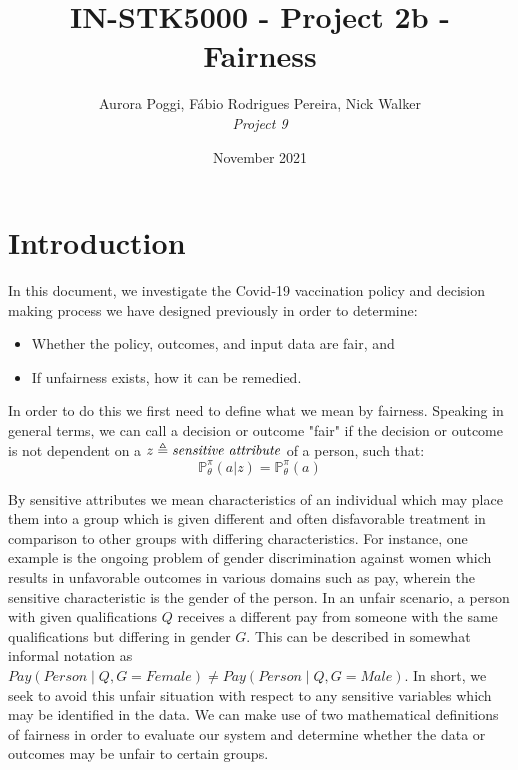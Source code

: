 \documentclass{article}
\title{IN-STK5000 - Project 2b - Fairness}
\author{Aurora Poggi, Fábio Rodrigues Pereira, Nick Walker \\
\emph{Project 9}}
\date{November 2021}
\begin{document}
\maketitle

\tableofcontents

\clearpage

\section{Introduction}
\label{sec: Introduction}

In this document, we investigate the Covid-19 vaccination policy and decision making process we have designed previously in order to determine: 
\begin{itemize}
    \item Whether the policy, outcomes, and input data are fair, and 
    \item If unfairness exists, how it can be remedied. 
\end{itemize}

In order to do this we first need to define what we mean by fairness. Speaking in general terms, we can call a decision or outcome "fair" if the decision or outcome is not dependent on a $z \triangleq \text{\textit{sensitive attribute}}$ of a person, such that:
\begin{equation}
\label{eq: 1}
    \mathbb{P}_\theta^\pi(a|z) = \mathbb{P}_\theta^\pi(a)
\end{equation}

By sensitive attributes we mean characteristics of an individual which may place them into a group which is given different and often disfavorable treatment in comparison to other groups with differing characteristics. For instance, one example is the ongoing problem of gender discrimination against women which results in unfavorable outcomes in various domains such as pay, wherein the sensitive characteristic is the gender of the person. In an unfair scenario, a person with given qualifications $Q$ receives a different pay from someone with the same qualifications but differing in gender $G$. This can be described in somewhat informal notation as $Pay(Person\;|\;Q,G=Female) \neq Pay(Person\;|\;Q,G=Male)$. In short, we seek to avoid this unfair situation with respect to any sensitive variables which may be identified in the data. We can make use of two mathematical definitions of fairness in order to evaluate our system and determine whether the data or outcomes may be unfair to certain groups.
\end{document}
